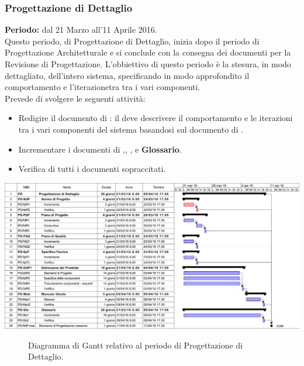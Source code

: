 \subsubsection{Progettazione di Dettaglio}
\textbf{Periodo:} dal 21 Marzo all'11 Aprile 2016. \\
Questo periodo, di Progettazione di Dettaglio, inizia dopo il periodo di Progettazione Architetturale e si conclude con la consegna dei documenti per la Revisione di Progettazione. L'obbiettivo di questo periodo è la stesura, in modo dettagliato, dell'intero sistema, specificando in modo approfondito il comportamento e l'iterazionetra tra i vari componenti. \\
Prevede di svolgere le seguenti attività:
\begin{itemize}
	\item Redigire il documento di \textbf{\DDP}: il \Prog deve descrivere il comportamento e le iterazioni tra i vari componenti del sistema basandosi sul documento di \ST.  
	\item Incrementare i documenti di \textbf{\NdP},\textbf{\PdP}, \textbf{\PdQ}, \textbf{\ST} e \textbf{Glossario}.
	\item Verifica di tutti i documenti sopraccitati.
\end{itemize}
\begin{center}
	\includegraphics[keepaspectratio = true, width=15cm]{immagini/PdP_ProgettazioneDiDettaglioGantt.png}
\end{center}
\begin{figure}[h]
	\caption{Diagramma di Gantt relativo al periodo di Progettazione di Dettaglio.}\label{etichetta}
\end{figure}

